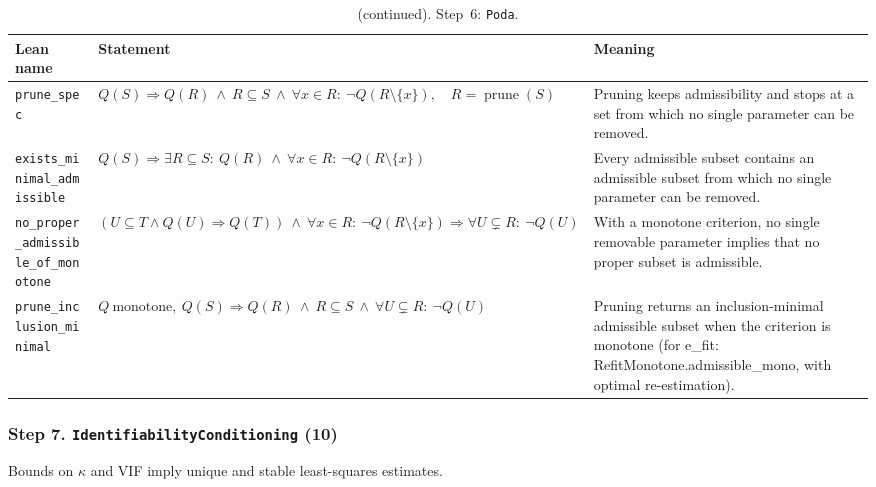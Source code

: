 \addtocounter{table}{-1}
{\small
\begin{longtable}{@{}>{\raggedright\arraybackslash}p{3.6cm}>{\raggedright\arraybackslash}p{6.6cm}>{\raggedright\arraybackslash}p{5.6cm}@{}}
\caption[]{(continued). Step~6: \texttt{Poda}.}\\
\toprule
Lean name & Statement & Meaning \\
\midrule
\endhead
\texttt{prune\_\allowbreak{}spec} & $\displaystyle Q(S)\Rightarrow Q(R)\ \wedge\ R\subseteq S\ \wedge\ \forall x\in R:\ \neg Q(R\setminus\{x\}),\quad R=\operatorname{prune}(S)$ & Pruning keeps admissibility and stops at a set from which no single parameter can be removed. \\[3pt]
\texttt{exists\_\allowbreak{}minimal\_\allowbreak{}admissible} & $\displaystyle Q(S)\Rightarrow\exists R\subseteq S:\ Q(R)\ \wedge\ \forall x\in R:\ \neg Q(R\setminus\{x\})$ & Every admissible subset contains an admissible subset from which no single parameter can be removed. \\[3pt]
\texttt{no\_\allowbreak{}proper\_\allowbreak{}admissible\_\allowbreak{}of\_\allowbreak{}monotone} & $\displaystyle (U\subseteq T\wedge Q(U)\Rightarrow Q(T))\ \wedge\ \forall x\in R:\ \neg Q(R\setminus\{x\})\Rightarrow\forall U\subsetneq R:\ \neg Q(U)$ & With a monotone criterion, no single removable parameter implies that no proper subset is admissible. \\[3pt]
\texttt{prune\_\allowbreak{}inclusion\_\allowbreak{}minimal} & $\displaystyle Q\ \text{monotone},\ Q(S)\Rightarrow Q(R)\ \wedge\ R\subseteq S\ \wedge\ \forall U\subsetneq R:\ \neg Q(U)$ & Pruning returns an inclusion-minimal admissible subset when the criterion is monotone (for e\_fit: RefitMonotone.admissible\_mono, with optimal re-estimation). \\[3pt]
\bottomrule
\end{longtable}
}

\subsubsection*{Step 7. \texttt{IdentifiabilityConditioning} (10)}
Bounds on $\kappa$ and VIF imply unique and stable least-squares estimates.

